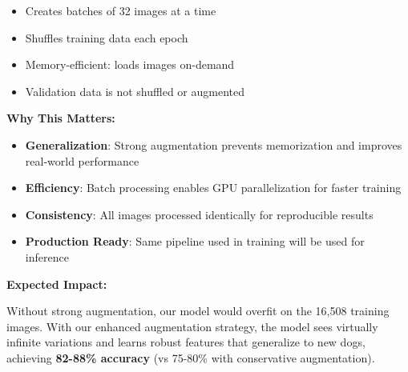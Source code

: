 \documentclass[
  letterpaper,
  DIV=11,
  numbers=noendperiod]{scrartcl}
\providecommand{\tightlist}{%
  \setlength{\itemsep}{0pt}\setlength{\parskip}{0pt}}
\begin{document}
\begin{enumerate}
  \begin{itemize}
  \tightlist
  \item
    Creates batches of 32 images at a time
  \item
    Shuffles training data each epoch
  \item
    Memory-efficient: loads images on-demand
  \item
    Validation data is not shuffled or augmented
  \end{itemize}
\end{enumerate}

\textbf{Why This Matters:}

\begin{itemize}
\tightlist
\item
  \textbf{Generalization}: Strong augmentation prevents memorization and
  improves real-world performance
\item
  \textbf{Efficiency}: Batch processing enables GPU parallelization for
  faster training
\item
  \textbf{Consistency}: All images processed identically for
  reproducible results
\item
  \textbf{Production Ready}: Same pipeline used in training will be used
  for inference
\end{itemize}

\textbf{Expected Impact:}

Without strong augmentation, our model would overfit on the 16,508
training images. With our enhanced augmentation strategy, the model sees
virtually infinite variations and learns robust features that generalize
to new dogs, achieving \textbf{82-88\% accuracy} (vs 75-80\% with
conservative augmentation).
\end{document}
